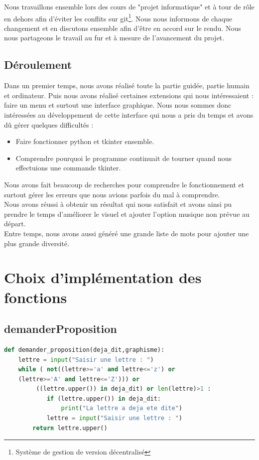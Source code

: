 \documentclass[french,10pt,a4paper]{article}	%
\begin{document}
Nous travaillons ensemble lors des cours de "projet informatique" et à tour de rôle en dehors afin d'éviter les conflits sur git\footnote{Système de gestion de version décentralisé}. Nous nous informons de chaque changement et en discutons ensemble afin d'être en accord sur le rendu. Nous nous partageons le travail au fur et à mesure de l'avancement du projet.

\subsection{Déroulement}

Dans un premier temps, nous avons réalisé toute la partie guidée, partie humain et ordinateur. Puis nous avons réalisé certaines extensions qui nous intéressaient : faire un menu et surtout une interface graphique. Nous nous sommes donc intéressées au développement de cette interface qui nous a pris du temps et avons dû gérer quelques difficultés :
\begin{itemize}
	\item Faire fonctionner python et tkinter ensemble.
	\item Comprendre pourquoi le programme continuait de tourner quand nous effectuions une commande tkinter.
\end{itemize}
Nous avons fait beaucoup de recherches pour comprendre le fonctionnement et surtout gérer les erreurs que nous avions parfois du mal à comprendre.\\
Nous avons réussi à obtenir un résultat qui nous satisfait et avons ainsi pu prendre le temps d'améliorer le visuel et ajouter l'option musique non prévue au départ.\\
Entre temps, nous avons aussi généré une grande liste de mots pour ajouter une plus grande diversité.

\section{Choix d'implémentation des fonctions}


	\subsection{demanderProposition}
	
	
	\begin{lstlisting}[language=Python, frame=single, showspaces=false, showstringspaces=false] 
def demander_proposition(deja_dit,graphisme):	
	lettre = input("Saisir une lettre : ")
	while ( not((lettre>='a' and lettre<='z') or
	(lettre>='A' and lettre<='Z'))) or
		 ((lettre.upper()) in deja_dit) or len(lettre)>1 :  
			if (lettre.upper()) in deja_dit:	 
				print("La lettre a deja ete dite")	 						
			lettre = input("Saisir une lettre : ")
		return lettre.upper() 															
	\end{lstlisting} %
	
\end{document}
